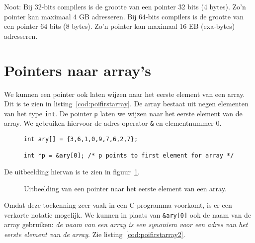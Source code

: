 Noot: Bij 32-bits compilers is de grootte van een pointer 32 bits (4 bytes). Zo'n pointer kan maximaal 4 GB adresseren. Bij 64-bits compilers is de grootte van een pointer 64 bits (8 bytes). Zo'n pointer kan maximaal 16 EB (exa-bytes) adresseren.

\section{Pointers naar array's}
\label{sec:pointersnaararrays}
We kunnen een pointer ook laten wijzen naar het eerste element van een array. Dit is te zien in listing~\ref{cod:poifirstarray}. De array bestaat uit negen elementen van het type \texttt{int}. De pointer \texttt{p} laten we wijzen naar het eerste element van de array. We gebruiken hiervoor de adres-operator \texttt{\&} en elementnummer 0.

\begin{figure}[!ht]
\begin{lstlisting}[caption=Een pointer naar het eerste element van een array.,label=cod:poifirstarray]
int ary[] = {3,6,1,0,9,7,6,2,7};

int *p = &ary[0]; /* p points to first element for array */
\end{lstlisting}
\end{figure}

De uitbeelding hiervan is te zien in figuur~\ref{fig:poifirstarray}.

\begin{figure}[!ht]
\centering
{}
\caption{Uitbeelding van een pointer naar het eerste element van een array.}
\label{fig:poifirstarray}
\end{figure}

Omdat deze toekenning zeer vaak in een C-programma voorkomt, is er een verkorte notatie mogelijk. We kunnen in plaats van \texttt{\&ary[0]} ook de naam van de array gebruiken: \textsl{de naam van een array is een synoniem voor een adres van het eerste element van de array}. Zie listing~\ref{cod:poifirstarray2}.

